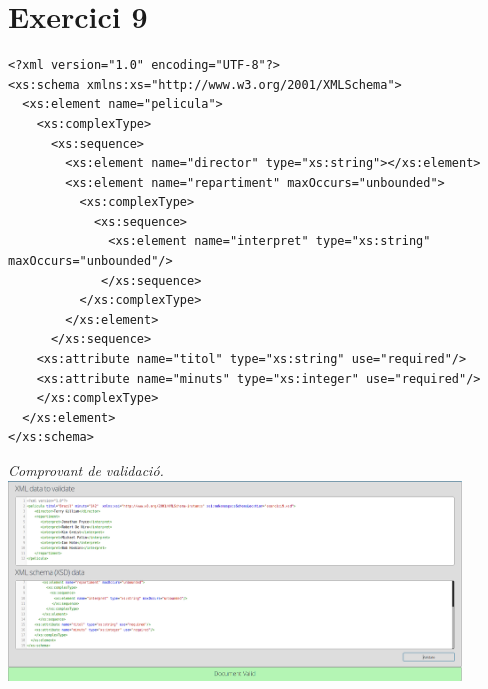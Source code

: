 \documentclass{article}
\begin{document}
\section{Exercici 9}

\begin{verbatim}
<?xml version="1.0" encoding="UTF-8"?>
<xs:schema xmlns:xs="http://www.w3.org/2001/XMLSchema">
  <xs:element name="pelicula">
    <xs:complexType>
      <xs:sequence>
        <xs:element name="director" type="xs:string"></xs:element>
        <xs:element name="repartiment" maxOccurs="unbounded">
          <xs:complexType>
            <xs:sequence>
              <xs:element name="interpret" type="xs:string" maxOccurs="unbounded"/>
             </xs:sequence>
          </xs:complexType>
        </xs:element>
      </xs:sequence>
    <xs:attribute name="titol" type="xs:string" use="required"/>
    <xs:attribute name="minuts" type="xs:integer" use="required"/>
    </xs:complexType>
  </xs:element>
</xs:schema>
\end{verbatim}
\vspace{0cm}
\begin{center}
    \textit{Comprovant de validació.}
    \includegraphics[width=12cm]{validacio9.png}
\end{center}
\newpage
\end{document}
